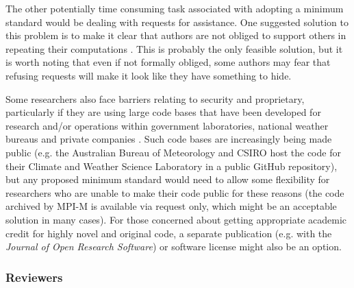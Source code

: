 The other potentially time consuming task associated with adopting a minimum standard would be dealing with requests for assistance. One suggested solution to this problem is to make it clear that authors are not obliged to support others in repeating their computations \citep{Easterbrook2014}. This is probably the only feasible solution, but it is worth noting that even if not formally obliged, some authors may fear that refusing requests will make it look like they have something to hide. 

Some researchers also face barriers relating to security and proprietary, particularly if they are using large code bases that have been developed for research and/or operations within government laboratories, national weather bureaus and private companies \citep{Stodden2010}. Such code bases are increasingly being made public (e.g. the Australian Bureau of Meteorology and CSIRO host the code for their Climate and Weather Science Laboratory in a public GitHub repository), but any proposed minimum standard would need to allow some flexibility for researchers who are unable to make their code public for these reasons (the code archived by MPI-M is available via request only, which might be an acceptable solution in many cases). For those concerned about getting appropriate academic credit for highly novel and original code, a separate publication (e.g. with the \textit{Journal of Open Research Software}) or software license \citep[e.g.][]{Stodden2009} might also be an option.

\subsubsection{Reviewers}

